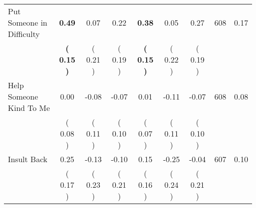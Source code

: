 \begin{tabular}{lcccccccc}
Put Someone in Difficulty & \textbf{     0.49} &      0.07 &      0.22 & \textbf{     0.38} &      0.05 &      0.27 & 608 &       0.17 \\ 
 & \textbf{(     0.15 )} & (     0.21 ) & (     0.19 ) & \textbf{(     0.15 )} & (     0.22 ) & (     0.19 ) & \\
Help Someone Kind To Me &      0.00 &     -0.08 &     -0.07 &      0.01 &     -0.11 &     -0.07 & 608 &       0.08 \\ 
 & (     0.08 ) & (     0.11 ) & (     0.10 ) & (     0.07 ) & (     0.11 ) & (     0.10 ) & \\
Insult Back &      0.25 &     -0.13 &     -0.10 &      0.15 &     -0.25 &     -0.04 & 607 &       0.10 \\ 
 & (     0.17 ) & (     0.23 ) & (     0.21 ) & (     0.16 ) & (     0.24 ) & (     0.21 ) & \\
\bottomrule
\end{tabular}
